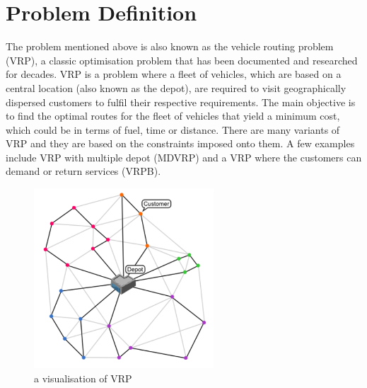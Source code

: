 \documentclass[a4paper, 12pt]{report}
\begin{document}
\section{Problem Definition}
The problem mentioned above is also known as the vehicle routing problem (VRP), a classic optimisation problem that has been
documented and researched for decades. VRP is a problem where a fleet of vehicles, which are based on a central location (also known
as the depot), are required to visit geographically dispersed customers to fulfil their respective requirements. The main objective is
to find the optimal routes for the fleet of vehicles that yield a minimum cost, which could be in terms of fuel, time or distance.
There are many variants of VRP and they are based on the constraints imposed onto them. A few examples include VRP with multiple depot (MDVRP) and
a VRP where the customers can demand or return services (VRPB).
\begin{figure}[!ht]
  \centering
    \includegraphics[width=0.6\textwidth]{vrp-sample.png}
    \caption{a visualisation of VRP}
\end{figure}
\end{document}
